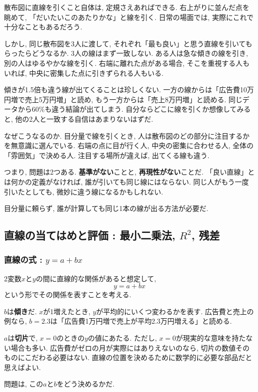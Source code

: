 散布図に直線を引くこと自体は, 定規さえあればできる.
右上がりに並んだ点を眺めて, 「だいたいこのあたりかな」と線を引く.
日常の場面では, 実際にこれで十分なこともあるだろう.

しかし, 同じ散布図を3人に渡して, それぞれ「最も良い」と思う直線を引いてもらったらどうなるか.
3人の線はまず一致しない.
ある人は急な傾きの線を引き, 別の人はゆるやかな線を引く.
右端に離れた点がある場合, そこを重視する人もいれば, 中央に密集した点に引きずられる人もいる.

傾きが1.5倍も違う線が出てくることは珍しくない.
一方の線からは「広告費10万円増で売上5万円増」と読め, もう一方からは「売上8万円増」と読める.
同じデータから60\%も違う結論が出てしまう.
自分ならどこに線を引くか想像してみると, 他の2人と一致する自信はあまりないはずだ.

なぜこうなるのか.
目分量で線を引くとき, 人は散布図のどの部分に注目するかを無意識に選んでいる.
右端の点に目が行く人, 中央の密集に合わせる人, 全体の「雰囲気」で決める人.
注目する場所が違えば, 出てくる線も違う.

つまり, 問題は2つある.
\textbf{基準がない}ことと, \textbf{再現性がない}ことだ.
「良い直線」とは何かの定義がなければ, 誰が引いても同じ線にはならない.
同じ人がもう一度引いたとしても, 微妙に違う線になるかもしれない.

目分量に頼らず, 誰が計算しても同じ1本の線が出る方法が必要だ.


\subsection{直線の当てはめと評価 : 最小二乗法, $R^2$, 残差}

\subsubsection*{直線の式 : $y = a + bx$}

2変数$x$と$y$の間に直線的な関係があると想定して,
\[
  y = a + bx
\]
という形でその関係を表すことを考える.

$b$は\textbf{傾き}だ.
$x$が1増えたとき, $y$が平均的にいくつ変わるかを表す.
広告費と売上の例なら, $b = 2.3$は「広告費1万円増で売上が平均2.3万円増える」と読める.

$a$は\textbf{切片}で, $x = 0$のときの$y$の値にあたる.
ただし, $x = 0$が現実的な意味を持たない場合も多い.
広告費がゼロの月が実際にはありえないのなら, 切片の数値そのものにこだわる必要はない.
直線の位置を決めるために数学的に必要な部品だと思えばよい.

問題は, この$a$と$b$をどう決めるかだ.

